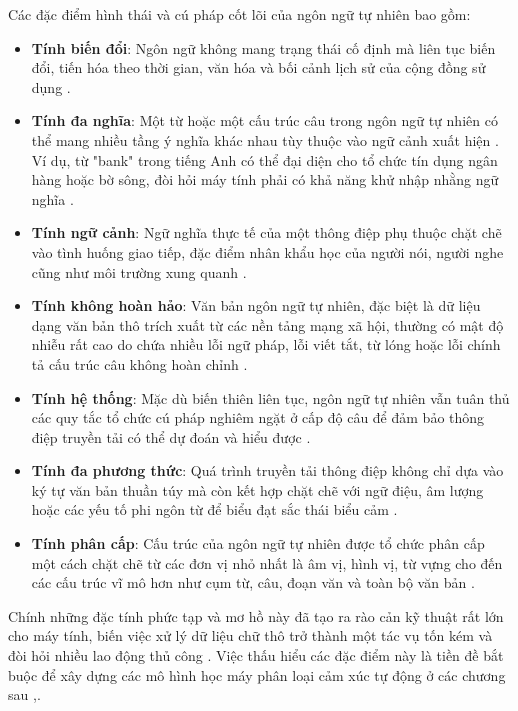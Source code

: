 Các đặc điểm hình thái và cú pháp cốt lõi của ngôn ngữ tự nhiên bao gồm:
\begin{itemize}
\item \textbf{Tính biến đổi}: Ngôn ngữ không mang trạng thái cố định mà liên tục biến đổi, tiến hóa theo thời gian, văn hóa và bối cảnh lịch sử của cộng đồng sử dụng \cite{singh2018natural}.

\item \textbf{Tính đa nghĩa}: Một từ hoặc một cấu trúc câu trong ngôn ngữ tự nhiên có thể mang nhiều tầng ý nghĩa khác nhau tùy thuộc vào ngữ cảnh xuất hiện \cite{singh2018natural}. Ví dụ, từ "bank" trong tiếng Anh có thể đại diện cho tổ chức tín dụng ngân hàng hoặc bờ sông, đòi hỏi máy tính phải có khả năng khử nhập nhằng ngữ nghĩa \cite{singh2018natural}.

\item \textbf{Tính ngữ cảnh}: Ngữ nghĩa thực tế của một thông điệp phụ thuộc chặt chẽ vào tình huống giao tiếp, đặc điểm nhân khẩu học của người nói, người nghe cũng như môi trường xung quanh \cite{singh2018natural}.

\item \textbf{Tính không hoàn hảo}: Văn bản ngôn ngữ tự nhiên, đặc biệt là dữ liệu dạng văn bản thô trích xuất từ các nền tảng mạng xã hội, thường có mật độ nhiễu rất cao do chứa nhiều lỗi ngữ pháp, lỗi viết tắt, từ lóng hoặc lỗi chính tả cấu trúc câu không hoàn chỉnh \cite{singh2018natural}.

\item \textbf{Tính hệ thống}: Mặc dù biến thiên liên tục, ngôn ngữ tự nhiên vẫn tuân thủ các quy tắc tổ chức cú pháp nghiêm ngặt ở cấp độ câu để đảm bảo thông điệp truyền tải có thể dự đoán và hiểu được \cite{singh2018natural}.

\item \textbf{Tính đa phương thức}: Quá trình truyền tải thông điệp không chỉ dựa vào ký tự văn bản thuần túy mà còn kết hợp chặt chẽ với ngữ điệu, âm lượng hoặc các yếu tố phi ngôn từ để biểu đạt sắc thái biểu cảm \cite{singh2018natural}.

\item \textbf{Tính phân cấp}: Cấu trúc của ngôn ngữ tự nhiên được tổ chức phân cấp một cách chặt chẽ từ các đơn vị nhỏ nhất là âm vị, hình vị, từ vựng cho đến các cấu trúc vĩ mô hơn như cụm từ, câu, đoạn văn và toàn bộ văn bản \cite{singh2018natural}.
\end{itemize}

Chính những đặc tính phức tạp và mơ hồ này đã tạo ra rào cản kỹ thuật rất lớn cho máy tính, biến việc xử lý dữ liệu chữ thô trở thành một tác vụ tốn kém và đòi hỏi nhiều lao động thủ công \cite{singh2018natural}. Việc thấu hiểu các đặc điểm này là tiền đề bắt buộc để xây dựng các mô hình học máy phân loại cảm xúc tự động ở các chương sau \cite{hastie2009elements},\cite{hochreiter1997long}.

